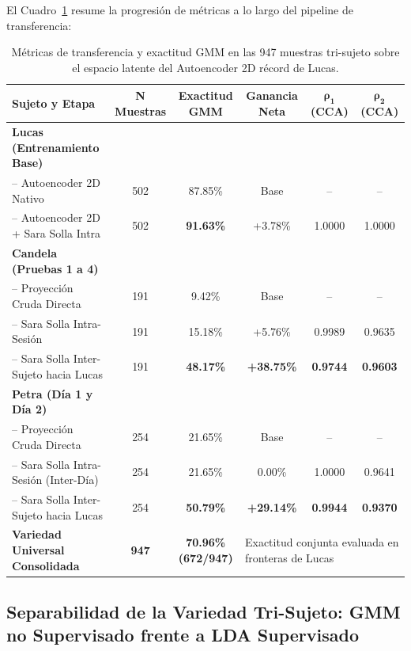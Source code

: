 \documentclass[11pt,a4paper]{article}
\begin{document}
El Cuadro~\ref{tab:transferencia_ae2d_tri_sujeto} resume la progresión de métricas a lo largo del pipeline de transferencia:

\begin{table}[H]
\centering
\small
\begin{tabular}{lccccc}
\toprule
\textbf{Sujeto y Etapa} & \textbf{N Muestras} & \textbf{Exactitud GMM} & \textbf{Ganancia Neta} & $\mathbf{\rho_1}$ \textbf{(CCA)} & $\mathbf{\rho_2}$ \textbf{(CCA)} \\
\midrule
\textbf{Lucas (Entrenamiento Base)} & & & & & \\
-- Autoencoder 2D Nativo & 502 & 87.85\% & Base & -- & -- \\
-- Autoencoder 2D + Sara Solla Intra & 502 & \textbf{91.63\%} & +3.78\% & 1.0000 & 1.0000 \\
\midrule
\textbf{Candela (Pruebas 1 a 4)} & & & & & \\
-- Proyección Cruda Directa & 191 & 9.42\% & Base & -- & -- \\
-- Sara Solla Intra-Sesión & 191 & 15.18\% & +5.76\% & 0.9989 & 0.9635 \\
-- Sara Solla Inter-Sujeto hacia Lucas & 191 & \textbf{48.17\%} & \textbf{+38.75\%} & \textbf{0.9744} & \textbf{0.9603} \\
\midrule
\textbf{Petra (Día 1 y Día 2)} & & & & & \\
-- Proyección Cruda Directa & 254 & 21.65\% & Base & -- & -- \\
-- Sara Solla Intra-Sesión (Inter-Día) & 254 & 21.65\% & 0.00\% & 1.0000 & 0.9641 \\
-- Sara Solla Inter-Sujeto hacia Lucas & 254 & \textbf{50.79\%} & \textbf{+29.14\%} & \textbf{0.9944} & \textbf{0.9370} \\
\midrule
\textbf{Variedad Universal Consolidada} & \textbf{947} & \textbf{70.96\% (672/947)} & \multicolumn{3}{l}{Exactitud conjunta evaluada en fronteras de Lucas} \\
\bottomrule
\end{tabular}
\caption{Métricas de transferencia y exactitud GMM en las 947 muestras tri-sujeto sobre el espacio latente del Autoencoder 2D récord de Lucas.}
\label{tab:transferencia_ae2d_tri_sujeto}
\end{table}

\subsection{Separabilidad de la Variedad Tri-Sujeto: GMM no Supervisado frente a LDA Supervisado}
\label{subsec:gmm_vs_lda_tri_sujeto}
\end{document}
